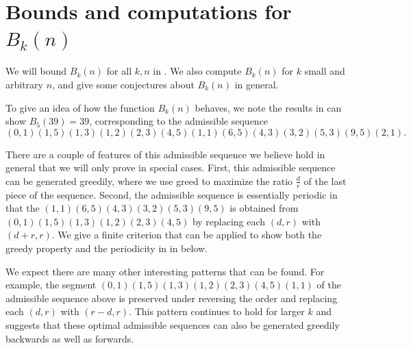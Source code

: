 \documentclass[11pt,reqno]{amsart}
\theoremstyle{plain}
\theoremstyle{definition}
\theoremstyle{remark}
\numberwithin{equation}{section}
\numberwithin{equation}{section}
\begin{document}
\section{Bounds and computations for $B_k(n)$}
\label{Phiknsection}
We will bound $B_k(n)$ for all $k,n$ in . We also compute $B_{k}(n)$ for $k$ small and arbitrary $n$, and give some conjectures about $B_{k}(n)$ in general.

To give an idea of how the function $B_k(n)$ behaves, we note the results in  can show $B_5(39)=39$, corresponding to the admissible sequence $$(0,1)(1,5)(1,3)(1,2)(2,3)(4,5)(1,1)(6,5)(4,3)(3,2)(5,3)(9,5)(2,1).$$

There are a couple of features of this admissible sequence we believe hold in general that we will only prove in special cases. First, this admissible sequence can be generated greedily, where we use greed to maximize the ratio $\frac{d}{r}$ of the last piece of the sequence. Second, the admissible sequence is essentially periodic in that the $(1,1)(6,5)(4,3)(3,2)(5,3)(9,5)$ is obtained from $(0,1)(1,5)(1,3)(1,2)(2,3)(4,5)$ by replacing each $(d,r)$ with $(d+r,r)$. We give a finite criterion that can be applied to show both the greedy property and the periodicity in  in  below.

We expect there are many other interesting patterns that can be found. For example, the segment $(0,1)(1,5)(1,3)(1,2)(2,3)(4,5)(1,1)$ of the admissible sequence above is preserved under reversing the order and replacing each $(d,r)$ with $(r-d,r)$. This pattern continues to hold for larger $k$ and suggests that these optimal admissible sequences can also be generated greedily backwards as well as forwards.
\end{document}
